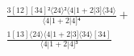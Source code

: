 \documentclass[varwidth, border=5pt]{standalone}
\begin{document}
\begin{my}
$\begin{gathered}
\scriptscriptstyle\frac{3[12][34]²⟨24⟩²⟨4|1+2|3]⟨34⟩}{⟨4|1+2|4]⁴} +\\
\scriptscriptstyle\frac{1[13]⟨24⟩⟨4|1+2|3]⟨34⟩[34]}{⟨4|1+2|4]³} \phantom{+}
\end{gathered}$
\end{my}
\end{document}
